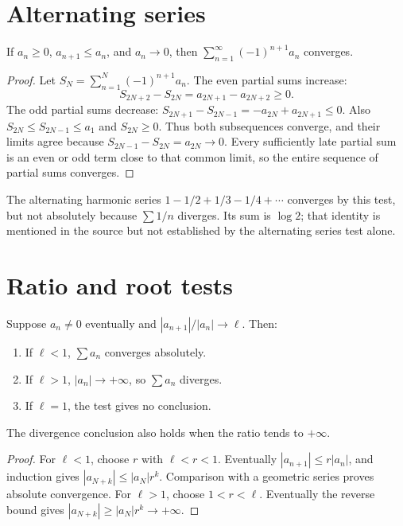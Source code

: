\section{Alternating series}
\begin{theorem}
If $a_n\geq0$, $a_{n+1}\leq a_n$, and $a_n\to0$, then
$\sum_{n=1}^{\infty}(-1)^{n+1}a_n$ converges.
\end{theorem}
\begin{proof}
Let $S_N=\sum_{n=1}^N(-1)^{n+1}a_n$. The even partial sums increase:
\[
S_{2N+2}-S_{2N}=a_{2N+1}-a_{2N+2}\geq0.
\]
The odd partial sums decrease:
$S_{2N+1}-S_{2N-1}=-a_{2N}+a_{2N+1}\leq0$.
Also $S_{2N}\leq S_{2N-1}\leq a_1$ and $S_{2N}\geq0$.
Thus both subsequences converge, and their limits agree because
$S_{2N-1}-S_{2N}=a_{2N}\to0$. Every sufficiently late partial sum is
an even or odd term close to that common limit, so the entire sequence
of partial sums converges.
\end{proof}
\begin{example}
The alternating harmonic series
$1-1/2+1/3-1/4+\cdots$ converges by this test, but not absolutely because
$\sum1/n$ diverges. Its sum is $\log2$; that identity is mentioned in
the source but not established by the alternating series test alone.
\end{example}

\section{Ratio and root tests}
\begin{theorem}
Suppose $a_n\ne0$ eventually and
$|a_{n+1}|/|a_n|\to\ell$. Then:
\begin{enumerate}
\item If $\ell<1$, $\sum a_n$ converges absolutely.
\item If $\ell>1$, $|a_n|\to+\infty$, so $\sum a_n$ diverges.
\item If $\ell=1$, the test gives no conclusion.
\end{enumerate}
The divergence conclusion also holds when the ratio tends to $+\infty$.
\end{theorem}
\begin{proof}
For $\ell<1$, choose $r$ with $\ell<r<1$. Eventually
$|a_{n+1}|\leq r|a_n|$, and induction gives
$|a_{N+k}|\leq|a_N|r^k$. Comparison with a geometric series proves
absolute convergence.
For $\ell>1$, choose $1<r<\ell$. Eventually the reverse bound gives
$|a_{N+k}|\geq|a_N|r^k\to+\infty$.
\end{proof}

